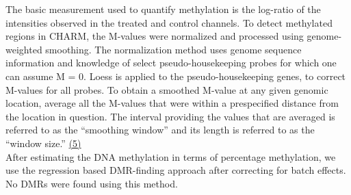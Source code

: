 \documentclass[11pt]{article}
\begin{document}

The basic measurement used to quantify methylation is the log-ratio of the intensities observed in the treated and control channels. To detect methylated regions in CHARM, the M-values were normalized and processed using genome-weighted smoothing. The normalization method uses genome sequence information and knowledge of select pseudo-housekeeping probes for which one can assume M = 0. Loess is applied to the pseudo-housekeeping genes, to correct M-values for all probes. To obtain a smoothed M-value at any given genomic location, average all the M-values that were within a prespecified distance from the location in question. The interval providing the values that are averaged is referred to as the “smoothing window” and its length is referred to as the “window size.” \href{http://www.ncbi.nlm.nih.gov/pmc/articles/PMC2336799/}{(5)} \\

After estimating the DNA methylation in terms of percentage methylation, we use the regression based DMR-finding approach after correcting for batch effects. No DMRs were found using this method.


%
%
\end{document}
